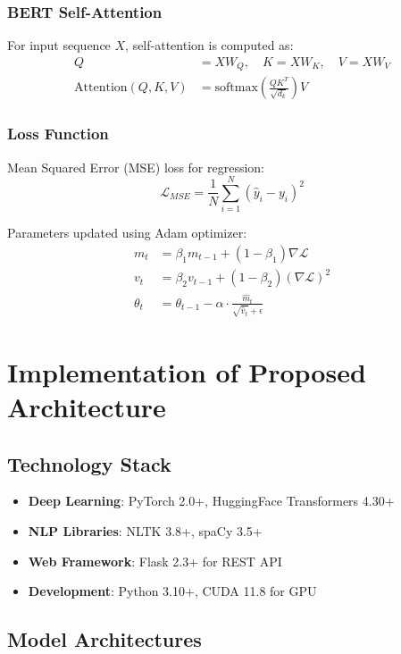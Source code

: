 \documentclass[12pt,a4paper]{article}
\begin{document}
\subsubsection{BERT Self-Attention}
For input sequence $X$, self-attention is computed as:
\begin{align}
Q &= XW_Q, \quad K = XW_K, \quad V = XW_V \\
\text{Attention}(Q,K,V) &= \text{softmax}\left(\frac{QK^T}{\sqrt{d_k}}\right)V
\end{align}

\subsubsection{Loss Function}
Mean Squared Error (MSE) loss for regression:
\begin{equation}
\mathcal{L}_{MSE} = \frac{1}{N}\sum_{i=1}^{N}(\hat{y}_i - y_i)^2
\end{equation}

Parameters updated using Adam optimizer:
\begin{align}
m_t &= \beta_1 m_{t-1} + (1-\beta_1)\nabla\mathcal{L} \\
v_t &= \beta_2 v_{t-1} + (1-\beta_2)(\nabla\mathcal{L})^2 \\
\theta_t &= \theta_{t-1} - \alpha \cdot \frac{\hat{m}_t}{\sqrt{\hat{v}_t} + \epsilon}
\end{align}

\newpage
\section{Implementation of Proposed Architecture}

\subsection{Technology Stack}
\begin{itemize}
    \item \textbf{Deep Learning}: PyTorch 2.0+, HuggingFace Transformers 4.30+
    \item \textbf{NLP Libraries}: NLTK 3.8+, spaCy 3.5+
    \item \textbf{Web Framework}: Flask 2.3+ for REST API
    \item \textbf{Development}: Python 3.10+, CUDA 11.8 for GPU
\end{itemize}

\subsection{Model Architectures}
\end{document}
